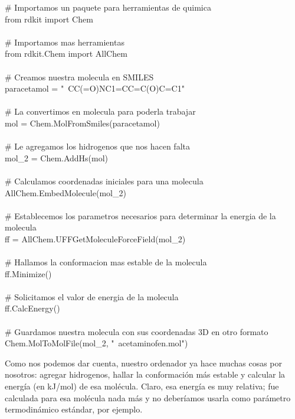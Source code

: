 \documentclass[10pt,letterpaper]{article}
\newenvironment{Code}
{
\begin{lrbox}{\selvestebox}%
\begin{minipage}{\dimexpr\columnwidth-2\fboxsep\relax}
\fontfamily{\ttdefault}\selectfont
}
{\end{minipage}\end{lrbox}%
\begin{center}
\colorbox{light-gray}{\usebox{\selvestebox}}
\end{center}
}
\begin{document}
\begin{footnotesize}
\begin{Code}
\# Importamos un paquete para herramientas de quimica\\
from rdkit import Chem\\
\ \\
\# Importamos mas herramientas\\
from rdkit.Chem import AllChem \\
\ \\
\# Creamos nuestra molecula en SMILES\\
paracetamol = "\ \hspace*{-2mm}CC(=O)NC1=CC=C(O)C=C1"\\
\ \\
\# La convertimos en molecula para poderla trabajar\\
mol = Chem.MolFromSmiles(paracetamol)\\
\ \\
\# Le agregamos los hidrogenos que nos hacen falta\\
mol\_2 = Chem.AddHs(mol)\\
\ \\
\# Calculamos coordenadas iniciales para una molecula\\
AllChem.EmbedMolecule(mol\_2)\\
\ \\
\# Establecemos los parametros necesarios para determinar la energia de la molecula\\
ff = AllChem.UFFGetMoleculeForceField(mol\_2)\\
\ \\
\# Hallamos la conformacion mas estable de la molecula\\
ff.Minimize()\\
\ \\
\# Solicitamos el valor de energia de la molecula\\
ff.CalcEnergy()\\
\ \\
\# Guardamos nuestra molecula con sus coordenadas 3D en otro formato\\
Chem.MolToMolFile(mol\_2, "\ \hspace*{-2mm}acetaminofen.mol")
\end{Code}
\end{footnotesize}

Como nos podemos dar cuenta, nuestro ordenador ya hace muchas cosas por nosotros: agregar hidrogenos, hallar la conformaci\'on m\'as estable y calcular la energ\'ia (en kJ/mol) de esa mol\'ecula. Claro, esa energ\'ia es muy relativa; fue calculada para esa mol\'ecula nada m\'as y no deber\'iamos usarla como par\'ametro termodin\'amico est\'andar, por ejemplo.\\
\end{document}

